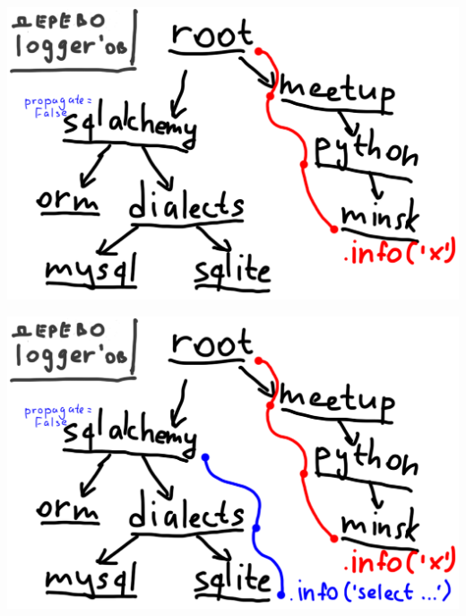 \documentclass[aspectratio=169]{beamer}
\begin{document}
\begin{frame}
  \begin{center}
    \includegraphics[scale=0.63]{img/loggers3.png}
  \end{center}
\end{frame}


\begin{frame}
  \begin{center}
    \includegraphics[scale=0.63]{img/loggers4.png}
  \end{center}
\end{frame}
\end{document}
